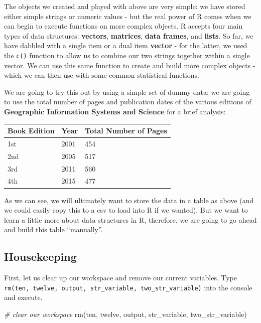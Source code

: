 \documentclass[
]{book}
\newenvironment{Shaded}{\begin{snugshade}}{\end{snugshade}}
\newcommand{\CommentTok}[1]{\textcolor[rgb]{0.56,0.35,0.01}{\textit{#1}}}
\newcommand{\FunctionTok}[1]{\textcolor[rgb]{0.00,0.00,0.00}{#1}}
\newcommand{\NormalTok}[1]{#1}
\begin{document}
The objects we created and played with above are very simple: we have stored either simple strings or numeric values - but the real power of R comes when we can begin to execute functions on more complex objects. R accepts four main types of data structures: \textbf{vectors}, \textbf{matrices}, \textbf{data frames}, and \textbf{lists}. So far, we have dabbled with a single item or a dual item \textbf{vector} - for the latter, we used the \texttt{c()} function to allow us to combine our two strings together within a single vector. We can use this same function to create and build more complex objects - which we can then use with some common statistical functions.

We are going to try this out by using a simple set of dummy data: we are going to use the total number of pages and publication dates of the various editions of \textbf{Geographic Information Systems and Science} for a brief analysis:

\begin{longtable}[]{@{}lll@{}}
\toprule()
Book Edition & Year & Total Number of Pages \\
\midrule()
\endhead
1st & 2001 & 454 \\
2nd & 2005 & 517 \\
3rd & 2011 & 560 \\
4th & 2015 & 477 \\
\bottomrule()
\end{longtable}

As we can see, we will ultimately want to store the data in a table as above (and we could easily copy this to a csv to load into R if we wanted). But we want to learn a little more about data structures in R, therefore, we are going to go ahead and build this table ``manually''.

\hypertarget{housekeeping}{%
\subsection{Housekeeping}\label{housekeeping}}

First, let us clear up our workspace and remove our current variables. Type \texttt{rm(ten,\ twelve,\ output,\ str\_variable,\ two\_str\_variable)} into the console and execute.

\begin{Shaded}
\begin{Highlighting}[]
\CommentTok{\# clear our workspace}
\FunctionTok{rm}\NormalTok{(ten, twelve, output, str\_variable, two\_str\_variable)}
\end{Highlighting}
\end{Shaded}
\end{document}
